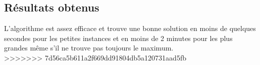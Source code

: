 \documentclass[12pt,a4paper]{article}
\begin{document}
\subsection{Résultats obtenus}
L'algorithme est assez efficace et trouve une bonne solution en moins de quelques secondes pour les petites instances et en moins de 2 minutes pour les plus grandes même s'il ne trouve pas toujours le maximum.\\
>>>>>>> 7d56ca5b611a2f669dd91804db5a120731aad5fb
\end{document}
